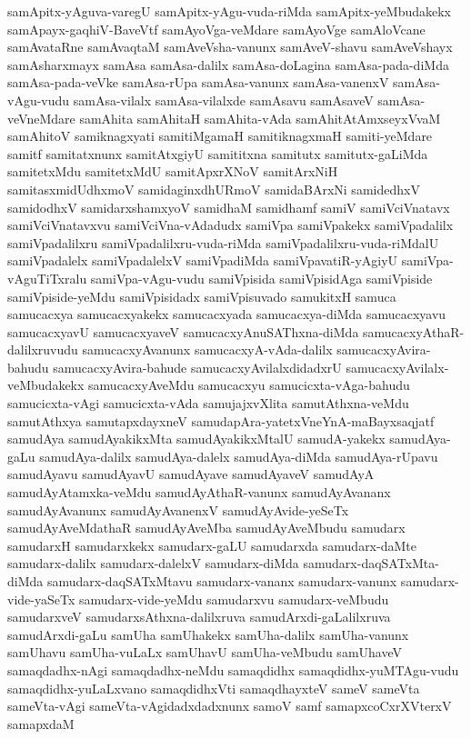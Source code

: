 {samApitx-yAguva-varegU
samApitx-yAgu-vuda-riMda
samApitx-yeMbudakekx
samApayx-gaqhiV-BaveVtf
samAyoVga-veMdare
samAyoVge
samAloVcane
samAvataRne
samAvaqtaM
samAveVsha-vanunx
samAveV-shavu
samAveVshayx
samAsharxmayx
samAsa
samAsa-dalilx
samAsa-doLagina
samAsa-pada-diMda
samAsa-pada-veVke
samAsa-rUpa
samAsa-vanunx
samAsa-vanenxV
samAsa-vAgu-vudu
samAsa-vilalx
samAsa-vilalxde
samAsavu
samAsaveV
samAsa-veVneMdare
samAhita
samAhitaH
samAhita-vAda
samAhitAtAmxseyxVvaM
samAhitoV
samiknagxyati
samitiMgamaH
samitiknagxmaH
samiti-yeMdare
samitf
samitatxnunx
samitAtxgiyU
samititxna
samitutx
samitutx-gaLiMda
samitetxMdu
samitetxMdU
samitApxrXNoV
samitArxNiH
samitasxmidUdhxmoV
samidaginxdhURmoV
samidaBArxNi
samidedhxV
samidodhxV
samidarxshamxyoV
samidhaM
samidhamf
samiV
samiVciVnatavx
samiVciVnatavxvu
samiVciVna-vAdadudx
samiVpa
samiVpakekx
samiVpadalilx
samiVpadalilxru
samiVpadalilxru-vuda-riMda
samiVpadalilxru-vuda-riMdalU
samiVpadalelx
samiVpadalelxV
samiVpadiMda
samiVpavatiR-yAgiyU
samiVpa-vAguTiTxralu
samiVpa-vAgu-vudu
samiVpisida
samiVpisidAga
samiVpiside
samiVpiside-yeMdu
samiVpisidadx
samiVpisuvado
samukitxH
samuca
samucacxya
samucacxyakekx
samucacxyada
samucacxya-diMda
samucacxyavu
samucacxyavU
samucacxyaveV
samucacxyAnuSAThxna-diMda
samucacxyAthaR-dalilxruvudu
samucacxyAvanunx
samucacxyA-vAda-dalilx
samucacxyAvira-bahudu
samucacxyAvira-bahude
samucacxyAvilalxdidadxrU
samucacxyAvilalx-veMbudakekx
samucacxyAveMdu
samucacxyu
samucicxta-vAga-bahudu
samucicxta-vAgi
samucicxta-vAda
samujajxvXlita
samutAthxna-veMdu
samutAthxya
samutapxdayxneV
samudapAra-yatetxVneYnA-maBayxsaqjatf
samudAya
samudAyakikxMta
samudAyakikxMtalU
samudA-yakekx
samudAya-gaLu
samudAya-dalilx
samudAya-dalelx
samudAya-diMda
samudAya-rUpavu
samudAyavu
samudAyavU
samudAyave
samudAyaveV
samudAyA
samudAyAtamxka-veMdu
samudAyAthaR-vanunx
samudAyAvananx
samudAyAvanunx
samudAyAvanenxV
samudAyAvide-yeSeTx
samudAyAveMdathaR
samudAyAveMba
samudAyAveMbudu
samudarx
samudarxH
samudarxkekx
samudarx-gaLU
samudarxda
samudarx-daMte
samudarx-dalilx
samudarx-dalelxV
samudarx-diMda
samudarx-daqSATxMta-diMda
samudarx-daqSATxMtavu
samudarx-vananx
samudarx-vanunx
samudarx-vide-yaSeTx
samudarx-vide-yeMdu
samudarxvu
samudarx-veMbudu
samudarxveV
samudarxsAthxna-dalilxruva
samudArxdi-gaLalilxruva
samudArxdi-gaLu
samUha
samUhakekx
samUha-dalilx
samUha-vanunx
samUhavu
samUha-vuLaLx
samUhavU
samUha-veMbudu
samUhaveV
samaqdadhx-nAgi
samaqdadhx-neMdu
samaqdidhx
samaqdidhx-yuMTAgu-vudu
samaqdidhx-yuLaLxvano
samaqdidhxVti
samaqdhayxteV
sameV
sameVta
sameVta-vAgi
sameVta-vAgidadxdadxnunx
samoV
samf
samapxcoCxrXVterxV
samapxdaM
}
